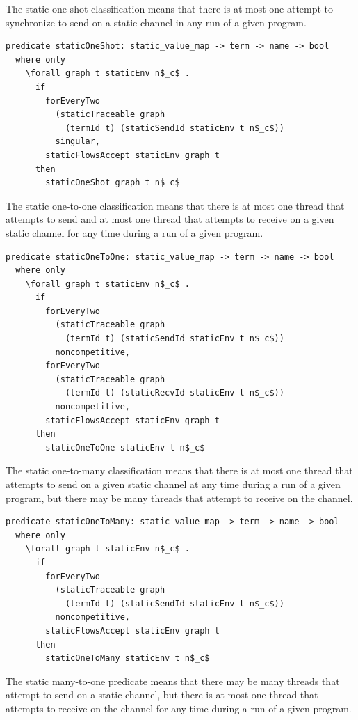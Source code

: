 \documentclass[letterpaper, 11pt]{extarticle}
\begin{document}
The static one-shot classification means that there is at most one attempt
to synchronize to send on a static channel in any run of a given program.

\begin{lstlisting}[language=logic, mathescape]
  predicate staticOneShot: static_value_map -> term -> name -> bool
  where only
    \forall graph t staticEnv n$_c$ .
      if
        forEveryTwo
          (staticTraceable graph
            (termId t) (staticSendId staticEnv t n$_c$))
          singular,
        staticFlowsAccept staticEnv graph t
      then
        staticOneShot graph t n$_c$
\end{lstlisting}

The static one-to-one classification means that there is at most one thread that attempts to
send and at most one thread that attempts to receive on a given static channel for any time
during a run of a given program.

\begin{lstlisting}[language=logic, mathescape]
  predicate staticOneToOne: static_value_map -> term -> name -> bool
  where only
    \forall graph t staticEnv n$_c$ .
      if
        forEveryTwo
          (staticTraceable graph
            (termId t) (staticSendId staticEnv t n$_c$))
          noncompetitive, 
        forEveryTwo
          (staticTraceable graph
            (termId t) (staticRecvId staticEnv t n$_c$))
          noncompetitive, 
        staticFlowsAccept staticEnv graph t 
      then
        staticOneToOne staticEnv t n$_c$
\end{lstlisting}

The static one-to-many classification means that there is at most one thread that attempts to
send on a given static channel at any time during a run of a given program, but there may be
many threads that attempt to receive on the channel.

\begin{lstlisting}[language=logic, mathescape]
  predicate staticOneToMany: static_value_map -> term -> name -> bool
  where only
    \forall graph t staticEnv n$_c$ .
      if
        forEveryTwo
          (staticTraceable graph
            (termId t) (staticSendId staticEnv t n$_c$))
          noncompetitive,
        staticFlowsAccept staticEnv graph t 
      then
        staticOneToMany staticEnv t n$_c$
\end{lstlisting}

The static many-to-one predicate means
that there may be many threads that attempt to send on a static channel, but there is at most
one thread that attempts to receive on the channel for any time during a run of a given
program.
\end{document}

